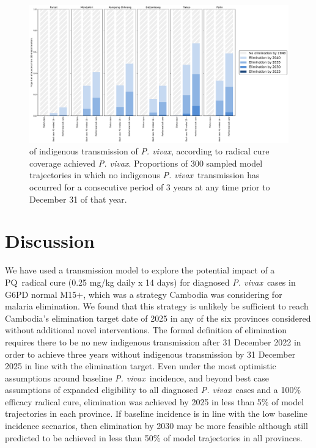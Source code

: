 \documentclass[doublespacing]{bmcart}
\newcommand{\pv}{\textit{P. vivax}}
\newcommand{\males}{M15$+$}
\newcommand{\pq}{PQ}
\begin{document}
\begin{figure}[h!]
\centering
\includegraphics[width=0.95\linewidth]{high_baseline.pdf}
\caption{ of indigenous transmission of \pv, according to radical cure coverage achieved \pv. Proportions of 300 sampled model trajectories in which no indigenous \pv~transmission has occurred for a consecutive period of 3 years at any time prior to December 31 of that year.}\label{fig:elimination_high}
\end{figure}

\section*{Discussion}

We have used a transmission model to explore the potential impact of a \pq~radical cure (0.25 mg/kg daily x 14 days) for diagnosed \pv~cases in G6PD normal \males, which was a strategy Cambodia was considering for malaria elimination.  We found that this strategy is unlikely be sufficient to reach Cambodia's elimination target date of 2025 in any of the six provinces considered without additional novel interventions. The formal definition of elimination requires there to be no new indigenous transmission after 31 December 2022 in order to achieve three years without indigenous transmission by 31 December 2025 in line with the elimination target. Even under the most optimistic assumptions around baseline \pv~incidence, and beyond best case assumptions of expanded eligibility to all diagnosed \pv~cases and a 100\% efficacy radical cure, elimination was achieved by 2025 in less than 5\% of model trajectories in each province. If baseline incidence is in line with the low baseline incidence scenarios, then elimination by 2030 may be more feasible although still predicted to be achieved in less than 50\% of model trajectories in all provinces.
\end{document}
